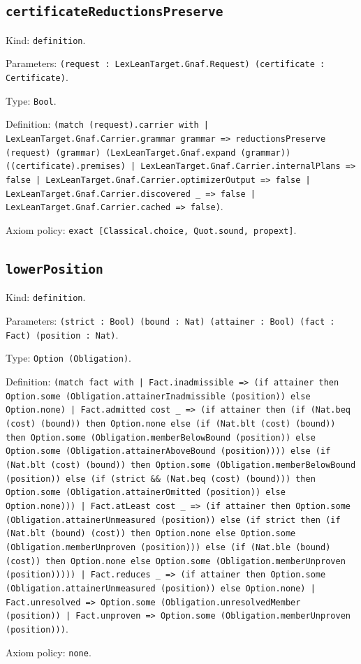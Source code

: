\documentclass[11pt]{article}
\begin{document}
\subsection*{\texttt{certificateReductionsPreserve}}
\noindent Kind: \texttt{definition}.\par
\noindent Parameters: \texttt{(request : LexLeanTarget.Gnaf.Request) (certificate : Certificate)}.\par
\noindent Type: \texttt{Bool}.\par
\noindent Definition: \texttt{(match (request).carrier with | LexLeanTarget.Gnaf.Carrier.grammar grammar => reductionsPreserve (request) (grammar) (LexLeanTarget.Gnaf.expand (grammar)) ((certificate).premises) | LexLeanTarget.Gnaf.Carrier.internalPlans => false | LexLeanTarget.Gnaf.Carrier.optimizerOutput => false | LexLeanTarget.Gnaf.Carrier.discovered \_ => false | LexLeanTarget.Gnaf.Carrier.cached => false)}.\par
\noindent Axiom policy: \texttt{exact [Classical.choice, Quot.sound, propext]}.\par
\subsection*{\texttt{lowerPosition}}
\noindent Kind: \texttt{definition}.\par
\noindent Parameters: \texttt{(strict : Bool) (bound : Nat) (attainer : Bool) (fact : Fact) (position : Nat)}.\par
\noindent Type: \texttt{Option (Obligation)}.\par
\noindent Definition: \texttt{(match fact with | Fact.inadmissible => (if attainer then Option.some (Obligation.attainerInadmissible (position)) else Option.none) | Fact.admitted cost \_ => (if attainer then (if (Nat.beq (cost) (bound)) then Option.none else (if (Nat.blt (cost) (bound)) then Option.some (Obligation.memberBelowBound (position)) else Option.some (Obligation.attainerAboveBound (position)))) else (if (Nat.blt (cost) (bound)) then Option.some (Obligation.memberBelowBound (position)) else (if (strict \&\& (Nat.beq (cost) (bound))) then Option.some (Obligation.attainerOmitted (position)) else Option.none))) | Fact.atLeast cost \_ => (if attainer then Option.some (Obligation.attainerUnmeasured (position)) else (if strict then (if (Nat.blt (bound) (cost)) then Option.none else Option.some (Obligation.memberUnproven (position))) else (if (Nat.ble (bound) (cost)) then Option.none else Option.some (Obligation.memberUnproven (position))))) | Fact.reduces \_ => (if attainer then Option.some (Obligation.attainerUnmeasured (position)) else Option.none) | Fact.unresolved => Option.some (Obligation.unresolvedMember (position)) | Fact.unproven => Option.some (Obligation.memberUnproven (position)))}.\par
\noindent Axiom policy: \texttt{none}.\par
\end{document}
